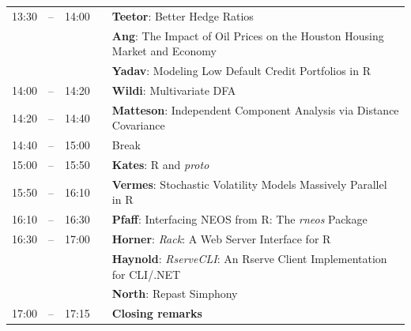 \documentclass[letterpaper,10pt]{article}
\newcommand{\mylinecolor}[1]{\color{#1}\vspace{-8pt}}  %
\begin{document}
\begin{tabular}{rlrlp{5in}}
13:30&\color{Breaks}-- & 14:00&   &\textbf{\color{LightningTalk} Teetor}: \small{Better Hedge Ratios} \\
     & &      &   &\textbf{\color{LightningTalk} Ang}: \small{The Impact of Oil Prices on the Houston Housing Market and Economy} \\
     & &      &   &\textbf{\color{LightningTalk} Yadav}: \small{Modeling Low Default Credit Portfolios in R} \\
14:00&\color{Breaks}-- & 14:20&   &\textbf{\color{Talk} Wildi}: \small{Multivariate DFA} \\
14:20&\color{Breaks}-- & 14:40&   &\textbf{\color{Talk} Matteson}: \small{Independent Component Analysis via Distance Covariance} \\
14:40&\color{Breaks}-- & 15:00&   &\small{\mylinecolor{Breaks} Break} \\
15:00&\color{Breaks}-- & 15:50&   &\textbf{\color{KeynoteTalk} Kates}: \small{R and \emph{proto}} \\
15:50&\color{Breaks}-- & 16:10&   &\textbf{\color{Talk} Vermes}: \small{Stochastic Volatility Models Massively Parallel in R} \\
16:10&\color{Breaks}-- & 16:30&   &\textbf{\color{Talk} Pfaff}: \small{Interfacing NEOS from R: The \emph{rneos} Package} \\
16:30&\color{Breaks}-- & 17:00&   &\textbf{\color{LightningTalk} Horner}: \small{\emph{Rack}: A Web Server Interface for R} \\
     & &      &   &\textbf{\color{LightningTalk} Haynold}: \small{\emph{RserveCLI}: An Rserve Client Implementation for CLI/.NET} \\
     & &      &   &\textbf{\color{LightningTalk} North}: \small{Repast Simphony} \\
17:00&\color{Breaks}-- & 17:15&   &\textbf{\color{Breaks} Closing remarks} \\

\end{tabular}
\end{document}
